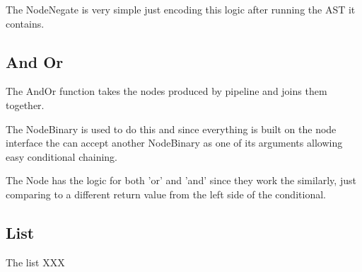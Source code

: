 The NodeNegate is very simple just encoding this logic after running the AST it contains.

\subsection{And Or}
The AndOr function takes the nodes produced by pipeline and joins them together.

The NodeBinary is used to do this and since everything is built on the node interface the can accept another NodeBinary as one of its arguments allowing easy conditional chaining.

The Node has the logic for both 'or' and 'and' since they work the similarly, just comparing to a different return value from the left side of the conditional.


\subsection{List}

The list   XXX











